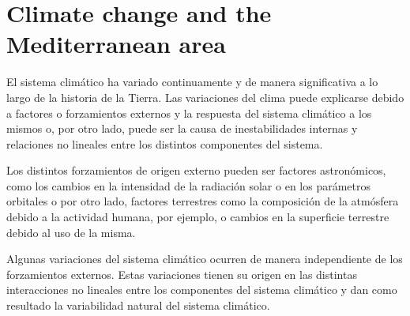 \section{Climate change and the Mediterranean area}


El sistema climático ha variado continuamente y de manera significativa a lo largo de la historia de la Tierra. Las variaciones del clima puede explicarse debido a factores o forzamientos externos y la respuesta del sistema climático a los mismos o, por otro lado, puede ser la causa de inestabilidades internas y relaciones no lineales entre los distintos componentes del sistema.

Los distintos forzamientos de origen externo pueden ser factores astronómicos, como los cambios en la intensidad de la radiación solar o en los parámetros orbitales o por otro lado, factores terrestres como la composición de la atmósfera debido a la actividad humana, por ejemplo, o cambios en la superficie terrestre debido al uso de la misma. 

Algunas variaciones del sistema climático ocurren de manera independiente de los forzamientos externos. Estas variaciones tienen su origen en las distintas interacciones no lineales entre los componentes del sistema climático y dan como resultado la variabilidad natural del sistema climático. 

